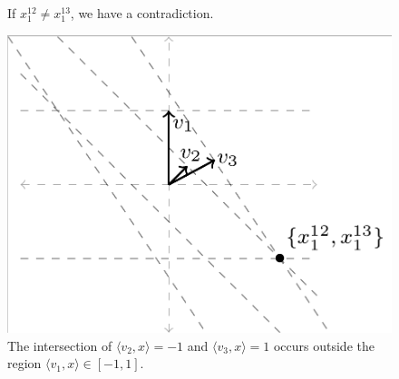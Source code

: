 \documentclass[anon]{colt2020} %
\newcommand{\inprod}[2]{\langle #1, #2 \rangle}%
\begin{document}
\begin{figure}
\begin{minipage}{0.3\linewidth}
		\caption{If $x^{12}_1 \neq x^{13}_1$, we have a contradiction.}
		\label{fig:qp-must-intersect-line-same-spot}
	\end{minipage}
	\begin{minipage}{0.3\linewidth}
	\centering
	\includegraphics[width=0.9\linewidth]{tikz/qp-line-intersect-contradiction}
	\caption{The intersection of $\inprod{v_2}{x} = -1$ and $\inprod{v_3}{x} = 1$ occurs outside the region $\inprod{v_1}{x} \in [-1,1]$.}
	\label{fig:qp-line-intersect-contradiction}
\end{minipage}
\hfill

\end{figure}
\end{document}
